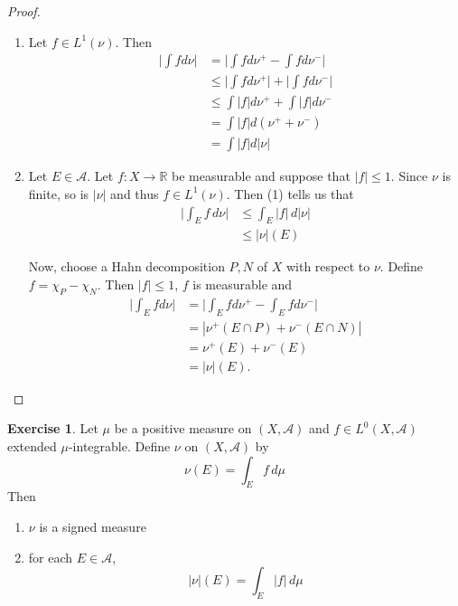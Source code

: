 \documentclass[12pt]{amsart}
\theoremstyle{definition}
\newtheorem{ex}[definition]{Exercise}
\newcommand{\R}{\mathbb{R}}
\newcommand{\MA}{\mathcal{A}}
\newcommand{\dmu}{\, d \mu}
\newcommand{\dnu}{\, d \nu}
\newcommand{\lex}[1]{\label{ex:#1}}
\begin{document}
	\begin{proof}
		\begin{enumerate}
			\item Let $f \in L^1(\nu)$. Then 
			\begin{align*}
				\bigg|\int f d \nu \bigg| 
				&= \bigg|\int f d \nu^+ - \int f d \nu^-\bigg|\\
				& \leq \bigg|\int f d \nu^+\bigg| + \bigg|\int f d \nu^-\bigg|\\
				& \leq \int |f| d\nu^+ + \int |f| d\nu^-\\
				&= \int |f| d (\nu^+ + \nu^-)\\
				&= \int |f| d |\nu|
			\end{align*}
			
			\item Let $E \in \MA$. Let $f:X \rightarrow \R$ be measurable and suppose that $|f| \leq 1$. Since $\nu$ is finite, so is $|\nu|$ and thus $f \in L^1(\nu)$. Then (1) tells us that 
			\begin{align*}
				\bigg |\int_E f \dnu \bigg| 
				& \leq \int_E |f| \, d |\nu|\\
				& \leq |\nu|(E) 
			\end{align*}
			
			Now, choose a Hahn decomposition $P,N$ of $X$ with respect to $\nu$. Define $f = \chi_{P} - \chi_{N}$. Then $|f| \leq 1$, $f$ is measurable and 
			\begin{align*}
				\bigg|\int_E f d\nu\bigg|
				&= \bigg|\int_E f d \nu^+ - \int_E f d \nu^-\bigg|\\
				&= | \nu^+(E \cap P) + \nu^-(E \cap N)|\\
				&= \nu^+(E) + \nu^-(E)\\
				&= |\nu|(E).
			\end{align*}
			
		\end{enumerate}
	\end{proof}
	
	\begin{ex} \lex{41016} 
		Let $\mu$ be a positive measure on $(X, \MA)$ and $f \in L^0(X, \MA)$ extended $\mu$-integrable. Define $\nu$ on $(X, \MA)$ by $$\nu(E) = \int_E f \dmu$$ Then
		\begin{enumerate}
			\item $\nu$ is a signed measure
			\item for each $E\in \MA$, $$|\nu|(E) = \int_E|f|\dmu$$
		\end{enumerate} 
	\end{ex}
	
\end{document}
